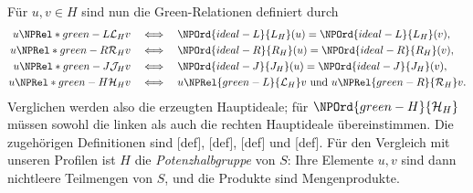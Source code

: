 Für \(u,v\in H\) sind nun die Green-Relationen definiert durch
\[
 \begin{aligned}
 u\NPRel*{green-L}{\mathcal L_H}v&\quad\Longleftrightarrow\quad \NPOrd{ideal-L}{L_H}(u)=\NPOrd{ideal-L}{L_H}(v),\\
 u\NPRel*{green-R}{\mathcal R_H}v&\quad\Longleftrightarrow\quad \NPOrd{ideal-R}{R_H}(u)=\NPOrd{ideal-R}{R_H}(v),\\
 u\NPRel*{green-J}{\mathcal J_H}v&\quad\Longleftrightarrow\quad \NPOrd{ideal-J}{J_H}(u)=\NPOrd{ideal-J}{J_H}(v),\\
 u\NPRel*{green-H}{\mathcal H_H}v&\quad\Longleftrightarrow\quad
   u\NPRel{green-L}{\mathcal L_H}v\ \text{und}\ u\NPRel{green-R}{\mathcal R_H}v.
 \end{aligned}
\]
Verglichen werden also die erzeugten Hauptideale; für
\(\NPOrd{green-H}{\mathcal H_H}\) müssen sowohl die linken als auch die rechten
Hauptideale übereinstimmen. Die zugehörigen Definitionen sind
[def],
[def],
[def] und
[def].
Für den Vergleich mit unseren Profilen ist \(H\) die
\emph{Potenzhalbgruppe} von \(S\): Ihre Elemente \(u,v\) sind dann
nichtleere Teilmengen von \(S\), und die Produkte sind Mengenprodukte.

